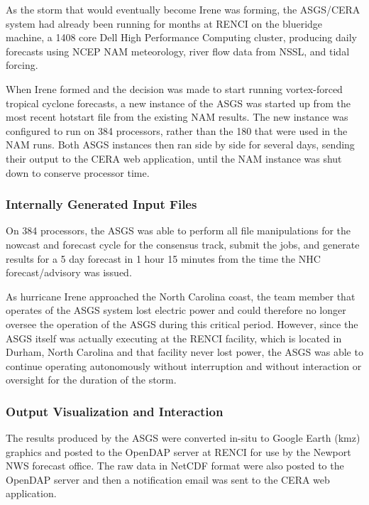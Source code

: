\documentclass[12pt]{article}
\begin{document}
As the storm that would eventually become Irene was forming, the 
ASGS/CERA system had already been running for months at RENCI on the 
blueridge machine, a 1408 core Dell High Performance Computing 
cluster, producing daily forecasts using NCEP NAM meteorology, river 
flow data from NSSL, and tidal forcing. 

When Irene formed and the decision was made to start running 
vortex-forced tropical cyclone forecasts, a new instance of the ASGS 
was started up from the most recent hotstart file from the existing 
NAM results. The new instance was configured to run on 384 
processors, rather than the 180 that were used in the NAM runs. Both 
ASGS instances then ran side by side for several days, sending their 
output to the CERA web application, until the NAM instance was shut 
down to conserve processor time.

\subsubsection{Internally Generated Input Files}

On 384 processors, the ASGS was able to perform all file 
manipulations for the nowcast and forecast cycle for the consensus 
track, submit the jobs, and generate results for a 5 day forecast in 
1 hour 15 minutes from the time the NHC forecast/advisory was issued. 

As hurricane Irene approached the North Carolina coast, the team 
member that operates of the ASGS system lost electric power and 
could therefore no longer oversee the operation of the ASGS during 
this critical period. However, since the ASGS itself was actually 
executing at the RENCI facility, which is located in Durham, North 
Carolina and that facility never lost power, the ASGS was able to 
continue operating autonomously without interruption and without 
interaction or oversight for the duration of the storm.  

\subsubsection{Output Visualization and Interaction}

The results produced by the ASGS were converted in-situ to Google 
Earth (kmz) graphics and posted to the OpenDAP server at RENCI for 
use by the Newport NWS forecast office. The raw data in NetCDF 
format were also posted to the OpenDAP server and then a 
notification email was sent to the CERA web application. 
\end{document}
